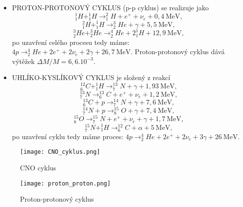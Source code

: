 \documentclass[../../main.tex]{subfiles}
\begin{document}
\begin{itemize}
	\item PROTON-PROTONOVÝ CYKLUS (p-p cyklus) se realizuje jako	
\begin{equation}
^{1}_{1} H + ^{1}_{1} H \rightarrow ^{2}_{1} H + e^+ + \nu _e + 0,4 ~\mathrm{MeV},
\end{equation}
\begin{equation}
^{2}_{1} H + ^{1}_{1} H \rightarrow ^{3}_{2} He + \gamma + 5,5 ~\mathrm{MeV},
\end{equation}
\begin{equation}
^{3}_{2} He + ^{3}_{2} He \rightarrow ^{4}_{2} He + 2 ^{1}_{1} H  + 12,9 ~\mathrm{MeV},
\end{equation}
po uzavření celého procesu tedy máme: $4p \rightarrow ^{4}_{2} He + 2 e^+ + 2 \nu_e + 2 \gamma + 26,7 ~\mathrm{MeV}$. Proton-protonový cyklus dává výtěžek $\Delta M /M = 6,6.10^{-3}$.

   \item UHLÍKO-KYSLÍKOVÝ CYKLUS je složený z reakcí
\begin{equation}
^{12}_{6} C + ^{1}_{1} H \rightarrow ^{13}_{7} N + \gamma +  1,93 ~\mathrm{MeV},
\end{equation}   
\begin{equation}
^{13}_{7} N  \rightarrow ^{13}_{6} C + e^+  + \nu _e  +  1,2 ~\mathrm{MeV},
\end{equation} 
\begin{equation}
^{13}_{6} C + p \rightarrow ^{14}_{7} N + \gamma +  7,6 ~\mathrm{MeV},
\end{equation} 
\begin{equation}
^{14}_{7} N + p \rightarrow ^{15}_{8} O + \gamma +  7,4 ~\mathrm{MeV},
\end{equation} 
\begin{equation}
^{15}_{8} O \rightarrow ^{15}_{7} N + e^+ + \nu _e + \gamma +  1,7 ~\mathrm{MeV},
\end{equation} 
\begin{equation}
^{15}_{7} N + ^{1}_{1} H \rightarrow ^{12}_{6} C + \alpha +  5 ~\mathrm{MeV},
\end{equation}
po uzavření cyklu tedy máme proces: $4p \rightarrow  ^{4}_{2} He + 2 e^+ + 2 \nu_e + 3 \gamma + 26 ~\mathrm{MeV}.$
\end{itemize}

\begin{figure}
	\begin{minipage}[c]{0.4\linewidth}
		\texttt{[image: CNO\_cyklus.png]}
		\caption{CNO cyklus}
	\end{minipage}
	\hfill
	\begin{minipage}[c]{0.4\linewidth}
		\texttt{[image: proton\_proton.png]}
		\caption{Proton-protonový cyklus}
	\end{minipage}
\end{figure}
\end{document}
